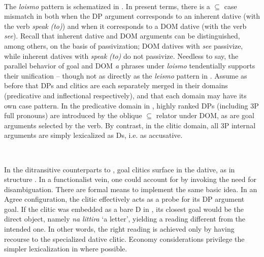 \documentclass[output=paper]{langscibook}
\begin{document}
\ea\label{ex:manzini:}
\langinfo{}{}{ [\textsubscript{IP} [\textsubscript{${\subseteq}$} le]  [\textsubscript{I} vi   [\textsubscript{ VP} vi  [\textsubscript{${\subseteq}$P} a la niña]]    (cf. \REF{ex:manzini:23b})}\\
\z

The \textit{loismo} pattern is schematized in . In present terms, there is a ${\subseteq}$ case mismatch in  both when the DP argument corresponds to an inherent dative (with the verb \textit{speak} \textit{(to)}) and when it corresponds to a DOM dative (with the verb \textit{see}). Recall that inherent dative and DOM arguments can be distinguished, among others, on the basis of passivization; DOM datives with \textit{see} passivize, while inherent datives with \textit{speak} \textit{(to)} do not passivize. Needless to say, the parallel behavior of goal and DOM \textit{a} phrases under \textit{loismo} tendentially supports their unification – though not as directly as the \textit{leismo} pattern in . Assume as before that DPs and clitics are each separately merged in their domains (predicative and inflectional respectively), and that each domain may have its own case pattern. In the predicative domain in , highly ranked DPs (including 3P full pronouns) are introduced by the oblique ${\subseteq}$ relator under DOM, as are goal arguments selected by the verb. By contrast, in the clitic domain, all 3P internal arguments are simply lexicalized as Ds, i.e. as accusative.

\ea\label{ex:manzini:}
\langinfo{}{}{[\textsubscript{IP} [\textsubscript{D} u] [\textsubscript{I} parlanu/viðinu   [\textsubscript{ VP} parlanu/viðinu  [\textsubscript{${\subseteq}$P} a iddu]]                    (cf. \REF{ex:manzini:21a})} \\
\z

In the ditransitive counterparts to , goal clitics surface in the dative, as in structure . In a functionalist vein, one could account for  by invoking the need for disambiguation. There are formal means to implement the same basic idea. In an Agree configuration, the clitic effectively acts as a probe for its DP argument goal. If the clitic was embedded as a bare D in , its closest goal would be the direct object, namely \textit{na} \textit{littira} ‘a letter’, yielding a reading different from the intended one. In other words, the right reading is achieved only by having recourse to the specialized dative clitic. Economy considerations privilege the simpler lexicalization in  where possible.
\end{document}
